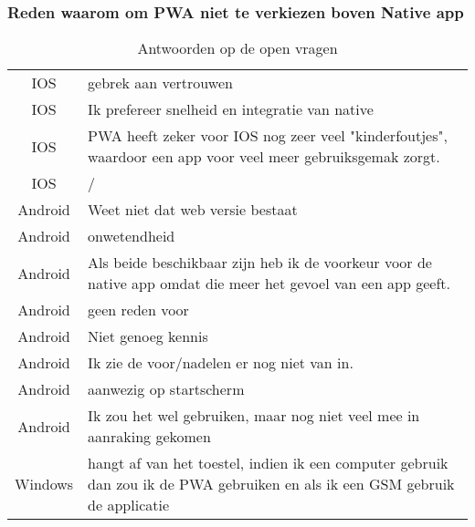 	\subsubsection{Reden waarom om PWA niet te verkiezen boven Native app}
		\begin{table}[H]
			\centering
			\begin{tabular}{cp{12cm}}
				IOS & gebrek aan vertrouwen \\
				IOS & Ik prefereer snelheid en integratie van native \\
				IOS & PWA heeft zeker voor IOS nog zeer veel "kinderfoutjes", waardoor een app voor veel meer gebruiksgemak zorgt. \\
				IOS & / \\
				Android & Weet niet dat web versie bestaat\\
				Android & onwetendheid\\
				Android & Als beide beschikbaar zijn heb ik de voorkeur voor de native app omdat die meer het gevoel van een app geeft.\\
				Android & geen reden voor\\
				Android & Niet genoeg kennis\\
				Android & Ik zie de voor/nadelen er nog niet van in.\\
				Android & aanwezig op startscherm\\
				Android & Ik zou het wel gebruiken, maar nog niet veel mee in
				aanraking gekomen \\
				Windows & hangt af van het toestel, indien ik een computer gebruik dan zou ik de PWA gebruiken en als ik een GSM gebruik de applicatie\\
			\end{tabular}	
			\caption{Antwoorden op de open vragen}
		\end{table}

	
	